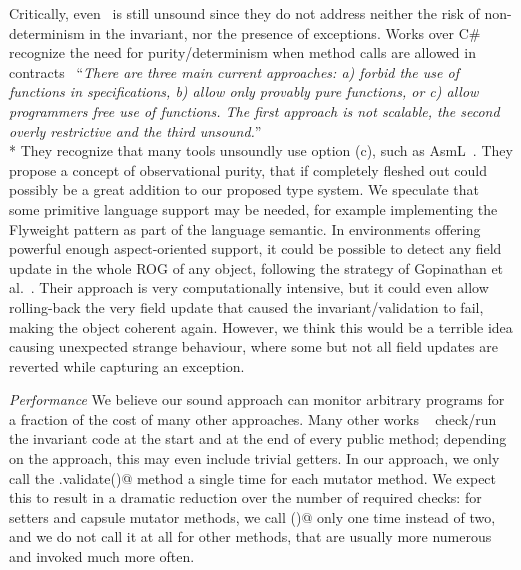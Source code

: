 Critically, even~\cite{Gopinathan:2008:RMO:1483018.1483028} is still unsound since they do not address neither
the risk of non-determinism in the invariant, 
nor the presence of exceptions.
\sepItems
Works over C\# recognize the need
for purity/determinism when method calls are allowed in contracts~\cite{barnett200499}
``\emph{There are three main current approaches: a) forbid the use of functions in specifications, b) allow only provably pure functions, or c) allow programmers free use
of functions. The first approach is not scalable, the second overly restrictive and
the third unsound.}''\\*
They recognize that many tools unsoundly use option (c), such as AsmL~\cite{barnett2003runtime}.
They propose a concept of observational purity, that if completely fleshed out
could possibly be a great addition to our proposed type system.
We speculate that some 
primitive language support may be needed, for example implementing the Flyweight pattern 
as part of the language semantic.
\sepItems
In environments offering powerful enough aspect-oriented support,
it could be possible to detect any field update in the whole ROG of
any object, following the strategy of 
Gopinathan et al.~\cite{Gopinathan:2008:RMO:1483018.1483028}.
Their approach is very computationally intensive, but it could even allow rolling-back the very field update that caused 
the invariant/validation to fail, making the object coherent again.
However, we think this would be a terrible idea causing unexpected strange behaviour, where some but not all
field updates are reverted while capturing an exception.



\noindent\textit{Performance}
We believe our sound approach can monitor arbitrary programs
for a fraction of the cost of many other approaches.
Many other works%
~\cite{feldman2006jose,fahndrich2010embedded,abercrombie2002jcontractor,tran2003design}
 check/run
the invariant code at the start and at the end of every public
method; depending on the approach, this may even include trivial getters.
In  our approach,
we only call the \Q@.validate()@ method a single time for each mutator method.
We expect this to result in a dramatic reduction over
the number of required checks:
for setters and capsule mutator methods, we call \Q@validate()@ only one time instead of two,
and we do not call it at all for other methods, that are usually more numerous and invoked much more often.






